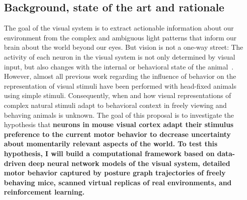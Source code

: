 \documentclass[COG,11pt]{ercgrant}
\begin{document}
\subsection{Background, state of the art and rationale}
The goal of the visual system is to extract actionable information about our environment from the complex and ambiguous light patterns that inform our brain about the world beyond our eyes.
But vision is not a one-way street: The activity of each neuron in the visual system is not only determined by visual input, but also changes with the internal or behavioral state of the animal~\parencite{Niell2010-bs, Erisken2014-un, Reimer2014-cf, Busse2017-rt, Musall2019-kd, Franke2022-do}. 
However, almost all previous work regarding the influence of behavior on the representation of visual stimuli have been performed with head-fixed animals using simple stimuli.
Consequently, when and how visual representations of complex natural stimuli adapt to behavioral context in freely viewing and behaving animals is unknown. 
The goal of this proposal is to investigate the hypothesis that
\textbf{neurons in mouse visual cortex adapt their stimulus preference to the current  motor behavior to decrease uncertainty about momentarily relevant aspects of the world. To test this hypothesis, I will build a computational framework based on data-driven deep neural network models of the visual system, detailed motor behavior captured by posture graph trajectories of freely behaving mice, scanned virtual replicas of real environments, and reinforcement learning.}
\end{document}
